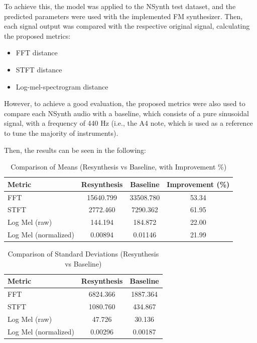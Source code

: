\documentclass[sigconf,natbib=false]{acmart}
\begin{document}
To achieve this, the model was applied to the NSynth test dataset, and the predicted parameters were used with the implemented FM synthesizer. Then, each signal output was compared with the respective original signal, calculating the proposed metrics:

\begin{itemize}
  \item FFT distance
  \item STFT distance
  \item Log-mel-spectrogram distance
\end{itemize}

However, to achieve a good evaluation, the proposed metrics were also used to compare each NSynth audio with a baseline, which consists of a pure sinusoidal signal, with a frequency of 440 Hz (i.e., the A4 note, which is used as a reference to tune the majority of instruments).

Then, the results can be seen in the following:

\begin{table}
  \caption{Comparison of Means (Resynthesis vs Baseline, with Improvement \%)}
  \label{tab:metrics_means}
  \begin{tabular}{lccc}
    \toprule
    Metric & Resynthesis & Baseline & Improvement (\%) \\
    \midrule
    FFT   & 15640.799 & 33508.780 & 53.34 \\
    STFT  & 2772.460  & 7290.362  & 61.95 \\
    Log Mel (raw) & 144.194 & 184.872 & 22.00 \\
    Log Mel (normalized) & 0.00894 & 0.01146 & 21.99 \\
    \bottomrule
  \end{tabular}
\end{table}

\begin{table}
  \caption{Comparison of Standard Deviations (Resynthesis vs Baseline)}
  \label{tab:metrics_std}
  \begin{tabular}{lcc}
    \toprule
    Metric & Resynthesis & Baseline \\
    \midrule
    FFT   & 6824.366 & 1887.364 \\
    STFT  & 1080.760 & 434.867  \\
    Log Mel (raw) & 47.726 & 30.136 \\
    Log Mel (normalized) & 0.00296 & 0.00187 \\
    \bottomrule
  \end{tabular}
\end{table}
\end{document}
